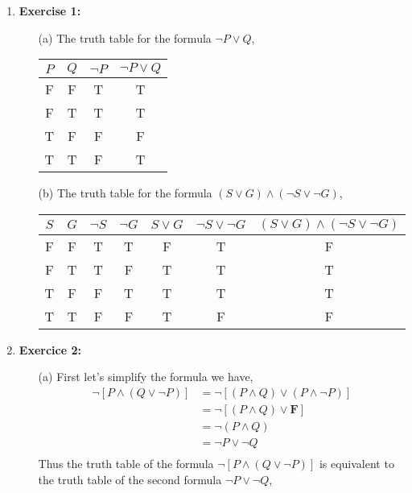 \documentclass{article} %
\begin{document}
    \begin{enumerate}
        \item \textbf{Exercise 1:}
        \begin{itemize}
            \item[(a)] The truth table for the formula $\neg P \lor Q$,
            \begin{center}
            \begin{tabular}{cccc}
                $P$ & $Q$ & $\neg P$ & $\neg P \lor Q$ \\
                \hline
                F & F & T & T \\
                F & T & T & T \\
                T & F & F & F \\
                T & T & F & T \\
            \end{tabular}
            \end{center}
            \item[(b)] The truth table for the formula $(S \lor G) \land (\neg S \lor \neg G)$,
            \begin{center}
            \begin{tabular}{ccccccc}
                $S$ & $G$ & $\neg S$ & $\neg G$ & $S \lor G$ & $\neg S \lor \neg G$ & $(S \lor G) \land (\neg S \lor \neg G)$ \\
                \hline
                F & F & T & T & F & T & F \\
                F & T & T & F & T & T & T \\
                T & F & F & T & T & T & T \\
                T & T & F & F & T & F & F \\
            \end{tabular}
            \end{center}
        \end{itemize} 
        \item \textbf{Exercice 2:}
        \begin{itemize}
            \item[(a)] First let's simplify the formula we have,
            \begin{equation*} 
                \begin{split}
                    \neg [P \land (Q \lor \neg P)] & = \neg [(P \land Q) \lor (P \land \neg P)] \\
                    & = \neg [(P \land Q) \lor \textbf{F}] \\
                    & = \neg (P \land Q) \\
                    & = \neg P \lor \neg Q \\
                \end{split}
            \end{equation*}
            Thus the truth table of the formula $\neg [P \land (Q \lor \neg P)]$ is equivalent to the truth table of the second formula $\neg P \lor \neg Q$,


\end{itemize}
\end{enumerate}
\end{document}
